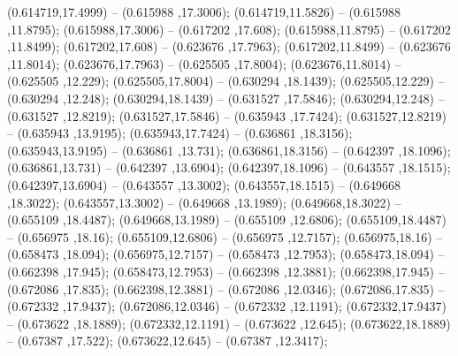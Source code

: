  (0.614719,17.4999) -- (0.615988 ,17.3006);
 (0.614719,11.5826) -- (0.615988 ,11.8795);
 (0.615988,17.3006) -- (0.617202 ,17.608);
 (0.615988,11.8795) -- (0.617202 ,11.8499);
 (0.617202,17.608) -- (0.623676 ,17.7963);
 (0.617202,11.8499) -- (0.623676 ,11.8014);
 (0.623676,17.7963) -- (0.625505 ,17.8004);
 (0.623676,11.8014) -- (0.625505 ,12.229);
 (0.625505,17.8004) -- (0.630294 ,18.1439);
 (0.625505,12.229) -- (0.630294 ,12.248);
 (0.630294,18.1439) -- (0.631527 ,17.5846);
 (0.630294,12.248) -- (0.631527 ,12.8219);
 (0.631527,17.5846) -- (0.635943 ,17.7424);
 (0.631527,12.8219) -- (0.635943 ,13.9195);
 (0.635943,17.7424) -- (0.636861 ,18.3156);
 (0.635943,13.9195) -- (0.636861 ,13.731);
 (0.636861,18.3156) -- (0.642397 ,18.1096);
 (0.636861,13.731) -- (0.642397 ,13.6904);
 (0.642397,18.1096) -- (0.643557 ,18.1515);
 (0.642397,13.6904) -- (0.643557 ,13.3002);
 (0.643557,18.1515) -- (0.649668 ,18.3022);
 (0.643557,13.3002) -- (0.649668 ,13.1989);
 (0.649668,18.3022) -- (0.655109 ,18.4487);
 (0.649668,13.1989) -- (0.655109 ,12.6806);
 (0.655109,18.4487) -- (0.656975 ,18.16);
 (0.655109,12.6806) -- (0.656975 ,12.7157);
 (0.656975,18.16) -- (0.658473 ,18.094);
 (0.656975,12.7157) -- (0.658473 ,12.7953);
 (0.658473,18.094) -- (0.662398 ,17.945);
 (0.658473,12.7953) -- (0.662398 ,12.3881);
 (0.662398,17.945) -- (0.672086 ,17.835);
 (0.662398,12.3881) -- (0.672086 ,12.0346);
 (0.672086,17.835) -- (0.672332 ,17.9437);
 (0.672086,12.0346) -- (0.672332 ,12.1191);
 (0.672332,17.9437) -- (0.673622 ,18.1889);
 (0.672332,12.1191) -- (0.673622 ,12.645);
 (0.673622,18.1889) -- (0.67387 ,17.522);
 (0.673622,12.645) -- (0.67387 ,12.3417);
